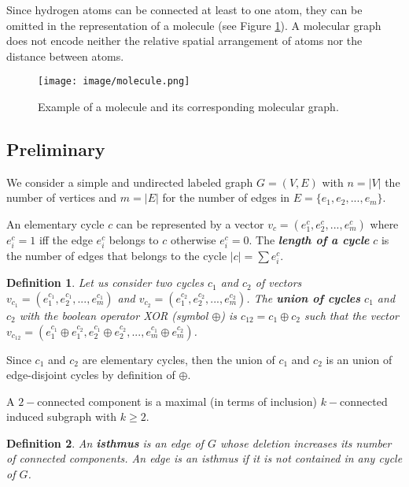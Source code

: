 \documentclass[journal=jacsat,manuscript=article]{achemso}
\newtheorem{definition}{Definition}
\begin{document}
Since hydrogen atoms can be connected at least to one atom, they can be omitted in the representation of a molecule (see Figure \ref{fig:graph}). A molecular graph does not encode neither the relative spatial arrangement of atoms nor the distance between atoms.

\begin{figure}[H]
\begin{center}
\texttt{[image: image/molecule.png]}
\caption{Example of a molecule and its corresponding molecular graph.}
\label{fig:graph}
\end{center}
\end{figure}

\subsection{Preliminary }

We consider a simple and undirected labeled graph $G=(V,E)$ with $n = |V|$ the number of vertices and $m = |E|$ for the number of edges in $E = \{e_1, e_2, ..., e_m\}$.

An elementary cycle $c$ can be represented by a vector $v_c = (e_1^c,e_2^c,...,e_m^c)$ where $e_i^c =1$ iff the edge $e_i^c$ belongs to $c$ otherwise $e_i^c= 0$. The\textbf{ \textit{length of a cycle}} $c$ is the number of edges that belongs to the cycle $|c| = \sum e_i^c$.

\begin{definition} 
Let us consider two cycles $c_1$ and $c_2$ of vectors $v_{c_1}  =(e_1^{c_1},e_2^{c_1},...,e_m^{c_1})$ and $v_{c_2} = (e_1^{c_2},e_2^{c_2},...,e_m^{c_2}) $. The \textbf{union of cycles} $c_1$ and $c_2$  with the boolean operator XOR (symbol $\oplus$) is $c_{12} = c_1 \oplus c_2 $ such that the vector $v_{c_{12}} = (e_1^{c_1} \oplus e_1^{c_2},e_2 ^{c_1}\oplus e_2^{c_2},...,e_m^{c_1}\oplus e_m^{c_2})$.
\end{definition} 

Since  $c_1$ and $c_2$ are elementary cycles, then the union of $c_1$ and $c_2$ is an union of edge-disjoint cycles by definition of $\oplus$.


A $2-$connected component is a maximal (in terms of inclusion) $k-$connected induced subgraph with $k \geq 2$.

\begin{definition}
An \textbf{isthmus} is an edge of $G$ whose deletion increases its number of connected components. An edge is an isthmus if it is not contained in any cycle of $G$.
\end{definition}
\end{document}
